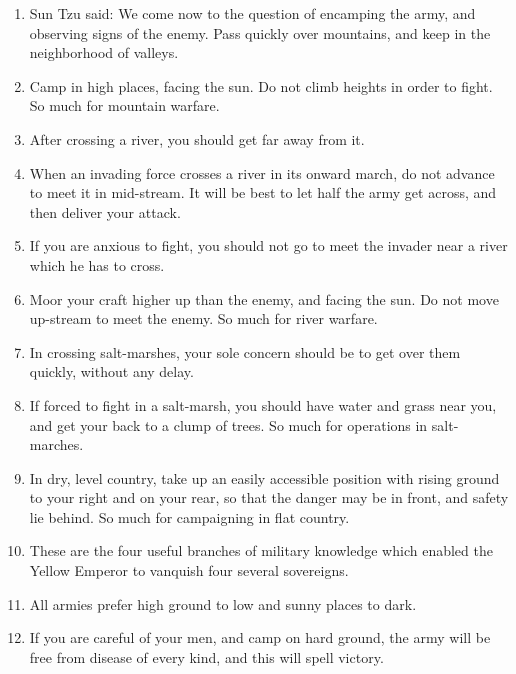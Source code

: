 \begin{enumerate}
  
\item Sun Tzu said:  We come now to the question of
    encamping the army, and observing signs of the enemy. 
    Pass quickly over mountains, and keep in the neighborhood
    of valleys.

  \item Camp in high places, facing the sun. Do not climb heights in
    order to fight. So much for mountain warfare.

  \item After crossing a river, you should get far away from it.

  \item When an invading force crosses a river in its onward march, do
    not advance to meet it in mid-stream. It will be best to let half
    the army get across, and then deliver your attack.

  \item If you are anxious to fight, you should not go to meet the
    invader near a river which he has to cross.

  \item Moor your craft higher up than the enemy, and facing the sun.
    Do not move up-stream to meet the enemy. So much for river
    warfare.

  \item In crossing salt-marshes, your sole concern should be to get
    over them quickly, without any delay.

  \item If forced to fight in a salt-marsh, you should have water and
    grass near you, and get your back to a clump of trees. So much for
    operations in salt-marches.

  \item In dry, level country, take up an easily accessible position
    with rising ground to your right and on your rear, so that the
    danger may be in front, and safety lie behind. So much for
    campaigning in flat country.

  \item These are the four useful branches of military knowledge which
    enabled the Yellow Emperor to vanquish four several sovereigns.

  \item All armies prefer high ground to low and sunny places to dark.

  \item If you are careful of your men, and camp on hard ground, the
    army will be free from disease of every kind, and this will spell
    victory.


\end{enumerate}
